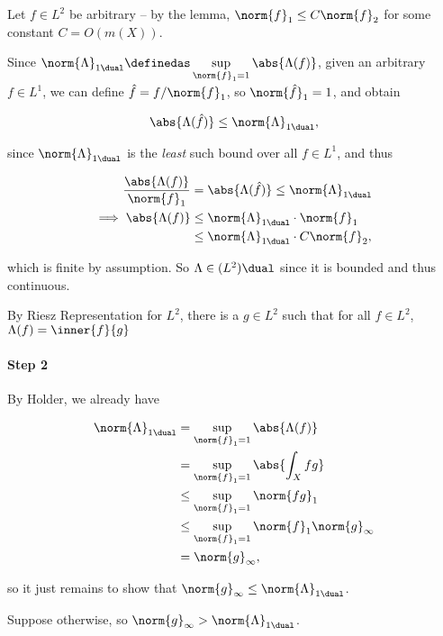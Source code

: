 Let \(f\in L^2\) be arbitrary -- by the lemma,
\(\norm{f}_1 \leq C\norm{f}_2\) for some constant \(C = O(m(X))\).

Since
\(\norm{\Lambda}_{1\dual} \definedas \displaystyle\sup_{\norm{f}_1 = 1} \abs{\Lambda(f)}\),
given an arbitrary \(f\in L^1\), we can define
\(\hat f = f/\norm{f}_1\), so \(\norm{\hat f}_1 = 1\), and obtain

\begin{align*}
\abs{\Lambda(\hat f)} \leq \norm{\Lambda}_{1\dual}
,\end{align*}

since \(\norm{\Lambda}_{1\dual}\) is the \emph{least} such bound over
all \(f\in L^1\), and thus

\begin{align*}
\frac{\abs{\Lambda(f)}}{\norm{f}_1} &= \abs{\Lambda(\hat f)} \leq \norm{\Lambda}_{1\dual} \\
\implies \abs{\Lambda(f)} 
&\leq \norm{\Lambda}_{1\dual} \cdot \norm{f}_1 \\
&\leq \norm{\Lambda}_{1\dual} \cdot C \norm{f}_2 
,\end{align*}

which is finite by assumption. So \(\Lambda \in (L^2)\dual\) since it is
bounded and thus continuous.

By Riesz Representation for \(L^2\), there is a \(g \in L^2\) such that
for all \(f\in L^2\), \(\Lambda(f) = \inner{f}{g}\)

\hypertarget{step-2}{%
\paragraph{Step 2}\label{step-2}}

By Holder, we already have

\begin{align*}
\norm{\Lambda}_{1\dual} 
&= \sup_{\norm{f}_1 = 1} \abs{\Lambda(f)} \\
&= \sup_{\norm{f}_1 = 1} \abs{\int_X fg} \\
&\leq \sup_{\norm{f}_1 = 1} \norm{fg}_1 \\
&\leq \sup_{\norm{f}_1 = 1} \norm{f}_1 \norm{g}_\infty \\
&= \norm{g}_\infty
,\end{align*}

so it just remains to show that
\(\norm{g}_\infty \leq \norm{\Lambda}_{1\dual}\).

Suppose otherwise, so \(\norm{g}_\infty > \norm{\Lambda}_{1\dual}\).

